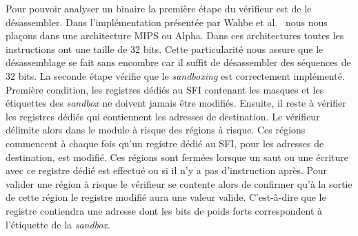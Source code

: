 \documentclass[11pt]{sdm}
\begin{document}
Pour pouvoir analyser un binaire la première étape du vérifieur est de le désassembler. Dans l'implémentation présentée par Wahbe et al.~\cite{Wahbe:1993:ESF:173668.168635} nous nous plaçons dans une architecture MIPS ou Alpha. Dans ces architectures toutes les instructions ont une taille de 32 bits. Cette particularité nous assure que le désassemblage se fait sans encombre car il suffit de désassembler des séquences de 32 bits.
La seconde étape vérifie que le \textit{sandboxing} est correctement implémenté. Première condition, les registres dédiés au SFI contenant les masques et les étiquettes des \textit{sandbox} ne doivent jamais être modifiés. Ensuite, il reste à vérifier les registres dédiés qui contiennent les adresses de destination. Le vérifieur délimite alors dans le module à risque des régions à risque. Ces régions commencent à chaque fois qu'un registre dédié au SFI, pour les adresses de destination, est modifié. Ces régions sont fermées lorsque un saut ou une écriture avec ce registre dédié est effectué ou si il n'y a pas d'instruction après. Pour valider une région à risque le vérifieur se contente alors de confirmer qu'à la sortie de cette région le registre modifié aura une valeur valide. C'est-à-dire que le registre contiendra une adresse dont les bits de poids forts correspondent à l'étiquette de la \textit{sandbox}.
\end{document}
